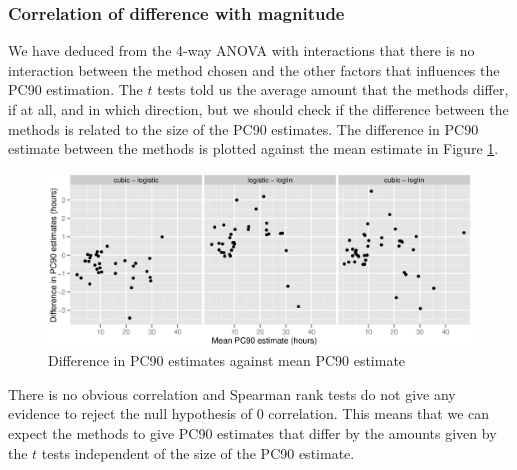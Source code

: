 \subsubsection*{Correlation of difference with magnitude}
We have deduced from the 4-way ANOVA with interactions that there is no interaction between the method chosen and the other factors that influences the PC90 estimation. The $t$ tests told us the average amount that the methods differ, if at all, and in which direction, but we should check if the difference between the methods is related to the size of the PC90 estimates. The difference in PC90 estimate between the methods is plotted against the mean estimate in Figure \ref{pc90est-cor}.
\begin{figure}[h]
\includegraphics[width=6.5in]{pc90est-cor.eps} 
\caption{Difference in PC90 estimates against mean PC90 estimate}
\label{pc90est-cor}
\end{figure}

There is no obvious correlation and Spearman rank tests do not give any evidence to reject the null hypothesis of 0 correlation. This means that we can expect the methods to give PC90 estimates that differ by the amounts given by the $t$ tests independent of the size of the PC90 estimate.
